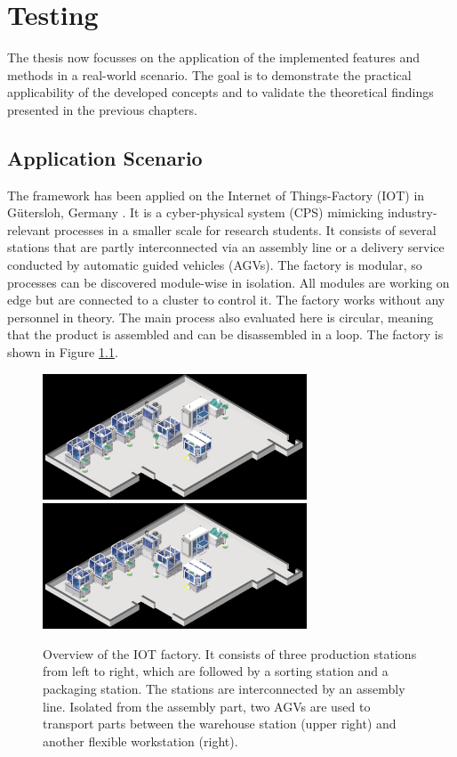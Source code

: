 \chapter{Testing}
\label{chap:case-study}

The thesis now focusses on the application of the implemented features and methods in a real-world scenario. The goal is to demonstrate the practical applicability of the developed concepts and to validate the theoretical findings presented in the previous chapters.

\section{Application Scenario}
\label{sec:factory}
The framework has been applied on the Internet of Things-Factory (IOT) in Gütersloh, Germany \parencite{IoTFactory2024}. It is a cyber-physical system (CPS) \parencite{baheti2011cyber} mimicking industry-relevant processes in a smaller scale for research students. It consists of several stations that are partly interconnected via an assembly line or a delivery service conducted by automatic guided vehicles (AGVs). The factory is modular, so processes can be discovered module-wise in isolation. All modules are working on edge but are connected to a cluster to control it. The factory works without any personnel in theory. The main process also evaluated here is circular, meaning that the product is assembled and can be disassembled in a loop. The factory is shown in Figure \ref{fig:iotoverview}.

\begin{figure}[htbp]
  \centering
  \includegraphics[width=0.7\textwidth]{figures/iot1.png}
  \includegraphics[width=0.7\textwidth]{figures/iot1.png}
  \caption{Overview of the IOT factory. It consists of three production stations from left to right, which are followed by a sorting station and a packaging station. The stations are interconnected by an assembly line. Isolated from the assembly part, two AGVs are used to transport parts between the warehouse station (upper right) and another flexible workstation (right).}
  \label{fig:iotoverview}
\end{figure}

